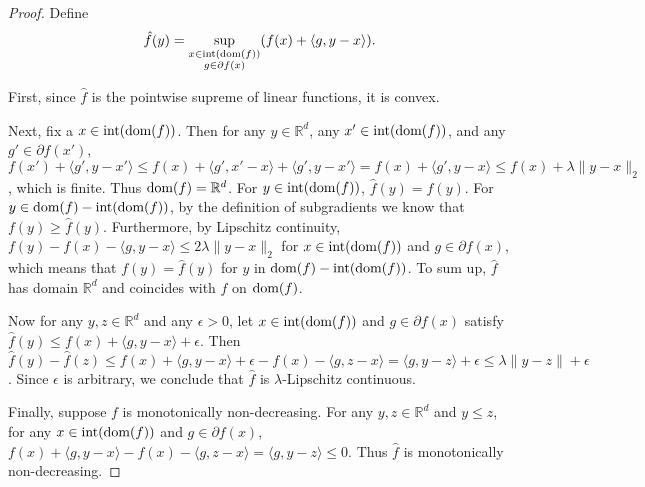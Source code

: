 \documentclass{article}
\def\int{\textup{int}}
\def\dom{\textup{dom}}
\begin{document}
\begin{proof}
    Define
    \begin{equation}
        \hat{f}(y)=\sup_{\substack{x\in\int(\dom(f)) \\ g\in\partial f(x)}}(f(x)+\langle g,y-x\rangle).
    \end{equation}

    First, since $\hat{f}$ is the pointwise supreme of linear functions, it is convex.

    Next, fix a $x\in\int(\dom(f))$. Then for any $y\in \mathbb{R}^d$, any $x'\in\int(\dom(f))$, and any $g'\in\partial f(x')$, $f(x')+\langle g',y-x'\rangle\le f(x)+\langle g',x'-x\rangle+\langle g',y-x'\rangle=f(x)+\langle g',y-x\rangle\le f(x)+\lambda\|y-x\|_2$, which is finite. Thus $\dom(f)=\mathbb{R}^d$. For $y\in\int(\dom(f))$, $\hat{f}(y)=f(y)$. For $y\in \dom(f)-\int(\dom(f))$, by the definition of subgradients we know that $f(y)\ge\hat{f}(y)$. Furthermore, by Lipschitz continuity, $f(y)-f(x)-\langle g,y-x\rangle\le2\lambda\|y-x\|_2$ for $x\in\int(\dom(f))$ and $g\in\partial f(x)$, which means that $f(y)=\hat{f}(y)$ for $y$ in $\dom(f)-\int(\dom(f))$. To sum up, $\hat{f}$ has domain $\mathbb{R}^d$ and coincides with $f$ on $\dom(f)$.

    Now for any $y,z\in \mathbb{R}^d$ and any $\epsilon>0$, let $x\in\int(\dom(f))$ and $g\in\partial f(x)$ satisfy $\hat{f}(y)\le f(x)+\langle g,y-x\rangle+\epsilon$. Then $\hat{f}(y)-\hat{f}(z)\le f(x)+\langle g,y-x\rangle+\epsilon-f(x)-\langle g,z-x\rangle=\langle g,y-z\rangle+\epsilon\le\lambda\|y-z\|+\epsilon$. Since $\epsilon$ is arbitrary, we conclude that $\hat{f}$ is $\lambda$-Lipschitz continuous.

    Finally, suppose $f$ is monotonically non-decreasing. For any $y,z\in \mathbb{R}^d$ and $y\le z$, for any $x\in\int(\dom(f))$ and $g\in\partial f(x)$, $f(x)+\langle g,y-x\rangle-f(x)-\langle g,z-x\rangle=\langle g,y-z\rangle\le 0$. Thus $\hat{f}$ is monotonically non-decreasing.
\end{proof}
\end{document}
